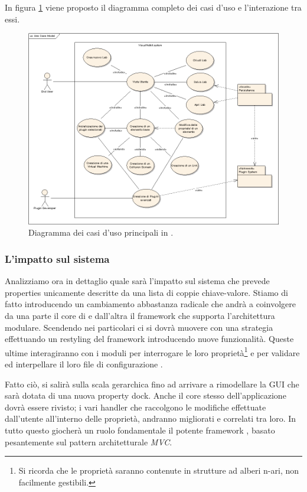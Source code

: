 In figura \ref{figura:uc1} viene proposto il diagramma completo dei casi d'uso e l'interazione tra essi.

\begin{figure}[!htb]
	\centering
	\includegraphics[width=12cm]{images/UseCaseModel.png}
	\caption{Diagramma dei casi d'uso principali in \visualnetkit{}.}
	\label{figura:uc1}
\end{figure}

\subsubsection{L'impatto sul sistema}
Analizziamo ora in dettaglio quale sarà l'impatto sul sistema che prevede properties unicamente descritte da una lista di coppie chiave-valore. Stiamo di fatto introducendo un cambiamento abbastanza radicale che andrà a coinvolgere da una parte il core di \visualnetkit{} e dall'altra il framework che supporta l'architettura modulare. Scendendo nei particolari ci si dovrà muovere con una strategia \bu{} effettuando un restyling del \plugin{} framework introducendo nuove funzionalità. Queste ultime interagiranno con i moduli per interrogare le loro proprietà\footnote{Si ricorda che le proprietà saranno contenute in strutture ad alberi n-ari, non facilmente gestibili.} e per validare ed interpellare il loro file di configurazione \xml{}.

Fatto ciò, si salirà sulla scala gerarchica fino ad arrivare a rimodellare la GUI che sarà dotata di una nuova property dock. Anche il core stesso dell'applicazione dovrà essere rivisto; i vari handler che raccolgono le modifiche effettuate dall'utente all'interno delle proprietà, andranno migliorati e correlati tra loro. In tutto questo giocherà un ruolo fondamentale il potente framework \qt{}, basato pesantemente sul pattern architetturale \emph{MVC}\cite{QTDOCMVC}.

